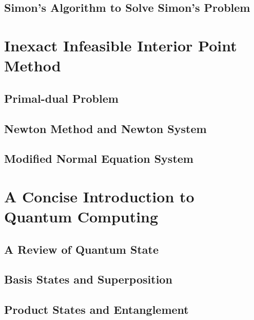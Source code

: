 \documentclass[
	11pt, %
	a4paper, %
]{LegrandOrangeBook}
\begin{document}
    \section{Simon's Algorithm to Solve Simon's Problem}
    

\chapter{Inexact Infeasible Interior Point Method}

    \section{Primal-dual Problem}
    

    \section{Newton Method and Newton System}
    

    \section{Modified Normal Equation System}
    

\chapter{A Concise Introduction to Quantum Computing}

    \section{A Review of Quantum State}
    

    \section{Basis States and Superposition}
    

    \section{Product States and Entanglement}
    
\end{document}
